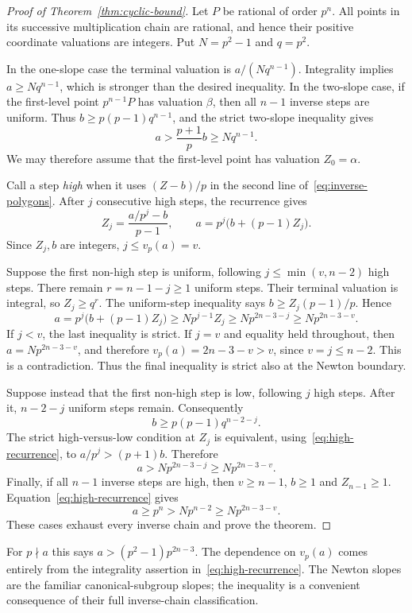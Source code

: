 \begin{proof}[Proof of Theorem~\ref{thm:cyclic-bound}]
Let $P$ be rational of order $p^n$. All points in its successive multiplication chain are rational, and hence their positive coordinate valuations are integers. Put $N=p^2-1$ and $q=p^2$.

In the one-slope case the terminal valuation is $a/(Nq^{n-1})$. Integrality implies $a\ge Nq^{n-1}$, which is stronger than the desired inequality. In the two-slope case, if the first-level point $p^{n-1}P$ has valuation $\beta$, then all $n-1$ inverse steps are uniform. Thus $b\ge p(p-1)q^{n-1}$, and the strict two-slope inequality gives
\[
 a>\frac{p+1}{p}b\ge Nq^{n-1}.
\]
We may therefore assume that the first-level point has valuation $Z_0=\alpha$.

Call a step \emph{high} when it uses $(Z-b)/p$ in the second line of~\eqref{eq:inverse-polygons}. After $j$ consecutive high steps, the recurrence gives
\begin{equation}\label{eq:high-recurrence}
 Z_j=\frac{a/p^j-b}{p-1},\qquad
 a=p^j\bigl(b+(p-1)Z_j\bigr).
\end{equation}
Since $Z_j,b$ are integers, $j\le v_p(a)=v$.

Suppose the first non-high step is uniform, following $j\le\min(v,n-2)$ high steps. There remain $r=n-1-j\ge1$ uniform steps. Their terminal valuation is integral, so $Z_j\ge q^r$. The uniform-step inequality says $b\ge Z_j(p-1)/p$. Hence
\[
 a=p^j\bigl(b+(p-1)Z_j\bigr)
   \ge Np^{j-1}Z_j
   \ge Np^{2n-3-j}
   \ge Np^{2n-3-v}.
\]
If $j<v$, the last inequality is strict. If $j=v$ and equality held throughout, then $a=Np^{2n-3-v}$, and therefore $v_p(a)=2n-3-v>v$, since $v=j\le n-2$. This is a contradiction. Thus the final inequality is strict also at the Newton boundary.

Suppose instead that the first non-high step is low, following $j$ high steps. After it, $n-2-j$ uniform steps remain. Consequently
\[
 b\ge p(p-1)q^{n-2-j}.
\]
The strict high-versus-low condition at $Z_j$ is equivalent, using~\eqref{eq:high-recurrence}, to $a/p^j>(p+1)b$. Therefore
\[
 a>Np^{2n-3-j}\ge Np^{2n-3-v}.
\]
Finally, if all $n-1$ inverse steps are high, then $v\ge n-1$, $b\ge1$ and $Z_{n-1}\ge1$. Equation~\eqref{eq:high-recurrence} gives
\[
 a\ge p^n>Np^{n-2}\ge Np^{2n-3-v}.
\]
These cases exhaust every inverse chain and prove the theorem.
\end{proof}

\begin{remark}
For $p\nmid a$ this says $a>(p^2-1)p^{2n-3}$. The dependence on $v_p(a)$ comes entirely from the integrality assertion in~\eqref{eq:high-recurrence}. The Newton slopes are the familiar canonical-subgroup slopes; the inequality is a convenient consequence of their full inverse-chain classification.
\end{remark}

